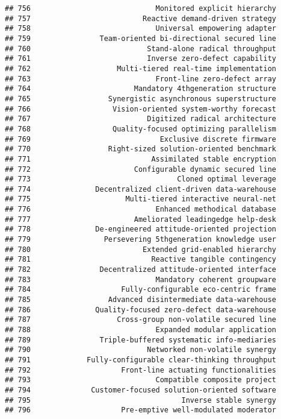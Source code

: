 \documentclass[
]{article}
\begin{document}
\begin{verbatim}
## 756                             Monitored explicit hierarchy
## 757                          Reactive demand-driven strategy
## 758                             Universal empowering adapter
## 759                Team-oriented bi-directional secured line
## 760                           Stand-alone radical throughput
## 761                           Inverse zero-defect capability
## 762                    Multi-tiered real-time implementation
## 763                             Front-line zero-defect array
## 764                        Mandatory 4thgeneration structure
## 765                  Synergistic asynchronous superstructure
## 766                   Vision-oriented system-worthy forecast
## 767                           Digitized radical architecture
## 768                   Quality-focused optimizing parallelism
## 769                              Exclusive discrete firmware
## 770                  Right-sized solution-oriented benchmark
## 771                            Assimilated stable encryption
## 772                        Configurable dynamic secured line
## 773                                  Cloned optimal leverage
## 774               Decentralized client-driven data-warehouse
## 775                      Multi-tiered interactive neural-net
## 776                             Enhanced methodical database
## 777                        Ameliorated leadingedge help-desk
## 778               De-engineered attitude-oriented projection
## 779                 Persevering 5thgeneration knowledge user
## 780                          Extended grid-enabled hierarchy
## 781                            Reactive tangible contingency
## 782                Decentralized attitude-oriented interface
## 783                             Mandatory coherent groupware
## 784                     Fully-configurable eco-centric frame
## 785                  Advanced disintermediate data-warehouse
## 786               Quality-focused zero-defect data-warehouse
## 787                    Cross-group non-volatile secured line
## 788                             Expanded modular application
## 789                Triple-buffered systematic info-mediaries
## 790                           Networked non-volatile synergy
## 791             Fully-configurable clear-thinking throughput
## 792                     Front-line actuating functionalities
## 793                             Compatible composite project
## 794              Customer-focused solution-oriented software
## 795                                   Inverse stable synergy
## 796                     Pre-emptive well-modulated moderator

\end{verbatim}
\end{document}
